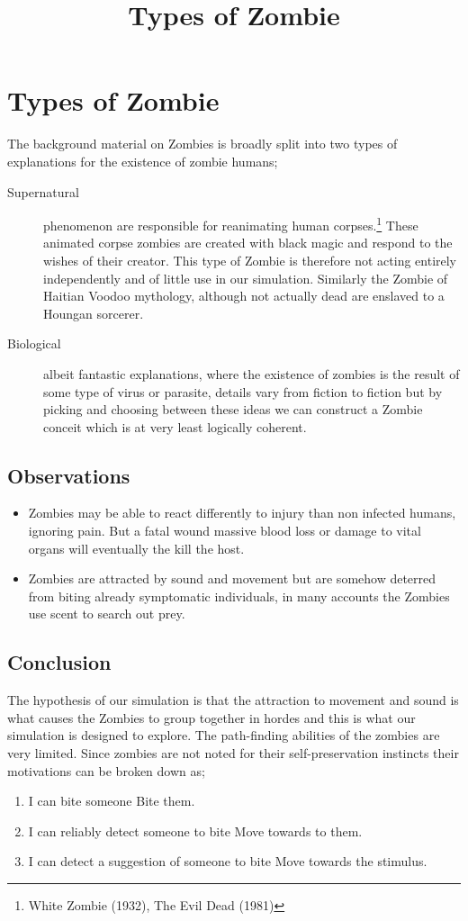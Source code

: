 \pagestyle{empty}
\title{Types of Zombie}

\section{Types of Zombie}The background material on Zombies is broadly split into two types of explanations for the existence of zombie humans;
\begin{description}
\item[Supernatural] phenomenon are responsible for reanimating human corpses.\footnote{White Zombie (1932), The Evil Dead (1981)} These animated corpse zombies are created with black magic and respond to the wishes of their creator. This type of Zombie is therefore not acting entirely independently and of little use in our simulation. Similarly the Zombie of Haitian Voodoo mythology, although not actually dead are enslaved to a Houngan sorcerer.
\item[Biological] albeit fantastic explanations, where the existence of zombies is the result of some type of virus or parasite, details vary from fiction to fiction but by picking and choosing between these ideas we can construct a Zombie conceit which is at very least logically coherent.
\end{description}
\subsection{Observations}
\begin{itemize}
\item Zombies may be able to react differently to injury than non infected humans, ignoring pain. But a fatal wound massive blood loss or damage to vital organs will eventually the kill the host.
\item
Zombies are attracted by sound and movement but are somehow deterred from biting already symptomatic individuals, in many accounts the Zombies use scent to search out prey.
\end{itemize}
\subsection{Conclusion}
The hypothesis of our simulation is that the attraction to movement and sound is what causes the Zombies to group together in hordes and this is what our simulation is designed to explore. The path-finding abilities of the zombies are very limited.
Since zombies are not noted for their self-preservation instincts their motivations can be broken down as;
\begin{enumerate}
\item I can bite someone Bite them.
\item I can reliably detect someone to bite Move towards to them.
\item I can detect a suggestion of someone to bite Move towards the stimulus.
\end{enumerate}
\endinput

